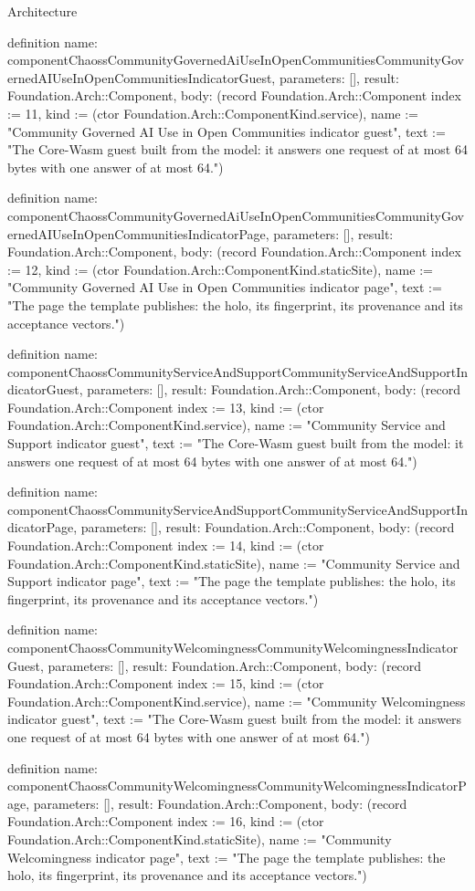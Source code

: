 \begin{lexlean}{Architecture}
\begin{semanticmodule}
definition{
  name: componentChaossCommunityGovernedAiUseInOpenCommunitiesCommunityGovernedAIUseInOpenCommunitiesIndicatorGuest,
  parameters: [],
  result: Foundation.Arch::Component,
  body: (record Foundation.Arch::Component {index := 11, kind := (ctor Foundation.Arch::ComponentKind.service), name := "Community Governed AI Use in Open Communities indicator guest", text := "The Core-Wasm guest built from the model: it answers one request of at most 64 bytes with one answer of at most 64."})
}

definition{
  name: componentChaossCommunityGovernedAiUseInOpenCommunitiesCommunityGovernedAIUseInOpenCommunitiesIndicatorPage,
  parameters: [],
  result: Foundation.Arch::Component,
  body: (record Foundation.Arch::Component {index := 12, kind := (ctor Foundation.Arch::ComponentKind.staticSite), name := "Community Governed AI Use in Open Communities indicator page", text := "The page the template publishes: the holo, its fingerprint, its provenance and its acceptance vectors."})
}

definition{
  name: componentChaossCommunityServiceAndSupportCommunityServiceAndSupportIndicatorGuest,
  parameters: [],
  result: Foundation.Arch::Component,
  body: (record Foundation.Arch::Component {index := 13, kind := (ctor Foundation.Arch::ComponentKind.service), name := "Community Service and Support indicator guest", text := "The Core-Wasm guest built from the model: it answers one request of at most 64 bytes with one answer of at most 64."})
}

definition{
  name: componentChaossCommunityServiceAndSupportCommunityServiceAndSupportIndicatorPage,
  parameters: [],
  result: Foundation.Arch::Component,
  body: (record Foundation.Arch::Component {index := 14, kind := (ctor Foundation.Arch::ComponentKind.staticSite), name := "Community Service and Support indicator page", text := "The page the template publishes: the holo, its fingerprint, its provenance and its acceptance vectors."})
}

definition{
  name: componentChaossCommunityWelcomingnessCommunityWelcomingnessIndicatorGuest,
  parameters: [],
  result: Foundation.Arch::Component,
  body: (record Foundation.Arch::Component {index := 15, kind := (ctor Foundation.Arch::ComponentKind.service), name := "Community Welcomingness indicator guest", text := "The Core-Wasm guest built from the model: it answers one request of at most 64 bytes with one answer of at most 64."})
}

definition{
  name: componentChaossCommunityWelcomingnessCommunityWelcomingnessIndicatorPage,
  parameters: [],
  result: Foundation.Arch::Component,
  body: (record Foundation.Arch::Component {index := 16, kind := (ctor Foundation.Arch::ComponentKind.staticSite), name := "Community Welcomingness indicator page", text := "The page the template publishes: the holo, its fingerprint, its provenance and its acceptance vectors."})
}


\end{semanticmodule}
\end{lexlean}
